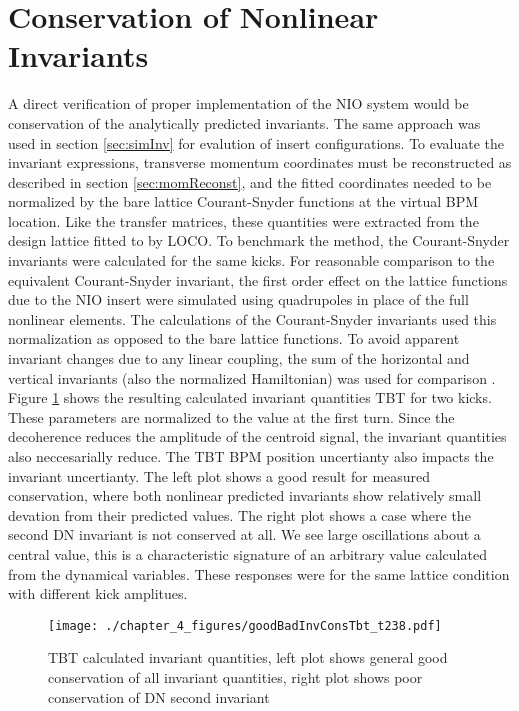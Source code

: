 \section{Conservation of Nonlinear Invariants} \label{sec:invConv}
A direct verification of proper implementation of the NIO system would be conservation of the analytically predicted invariants. The same approach was used in section \ref{sec:simInv} for evalution of insert configurations. To evaluate the invariant expressions, transverse momentum coordinates must be reconstructed as described in section \ref{sec:momReconst}, and the fitted coordinates needed to be normalized by the bare lattice Courant-Snyder functions at the virtual BPM location. Like the transfer matrices, these quantities were extracted from the design lattice fitted to by LOCO. To benchmark the method, the Courant-Snyder invariants were calculated for the same kicks. For reasonable comparison to the equivalent Courant-Snyder invariant, the first order effect on the lattice functions due to the NIO insert were simulated using quadrupoles in place of the full nonlinear elements. The calculations of the Courant-Snyder invariants used this normalization as opposed to the bare lattice functions. To avoid apparent invariant changes due to any linear coupling, the sum of the horizontal and vertical invariants (also the normalized Hamiltonian) was used for comparison \cite{leeAccelerator}.  Figure \ref{fig:invTbt} shows the resulting calculated invariant quantities TBT for two kicks. These parameters are normalized to the value at the first turn. Since the decoherence reduces the amplitude of the centroid signal, the invariant quantities also neccesarially reduce. The TBT BPM position uncertianty also impacts the invariant uncertianty. The left plot shows a good result for measured conservation, where both nonlinear predicted invariants show relatively small devation from their predicted values. The right plot shows a case where the second DN invariant is not conserved at all. We see large oscillations about a central value, this is a characteristic signature of an arbitrary value calculated from the dynamical variables. These responses were for the same lattice condition with different kick amplitues.

\begin{figure}
	\centering
	\texttt{[image: ./chapter\_4\_figures/goodBadInvConsTbt\_t238.pdf]}
	\caption{TBT calculated invariant quantities, left plot shows general good conservation of all invariant quantities, right plot shows poor conservation of DN second invariant}
	\label{fig:invTbt}
\end{figure}


